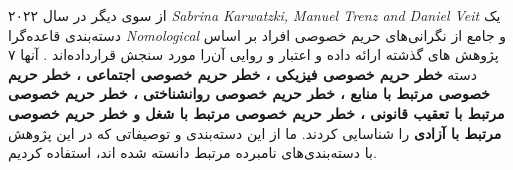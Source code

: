 

	از سوی دیگر
\fi %
\ifMultidimensionalNatureOfPrivacyRisksConceptualisationMeasurementAndImplicationsForDigitalServices
	در سال ۲۰۲۲
	\textit{
		\gls{Sabrina Karwatzki, Manuel Trenz and Daniel Veit}
	}
	 یک دسته‌بندی قاعده‌گرا
	\textit{
		\gls{Nomological}
	}
	و جامع از نگرانی‌های حریم خصوصی افراد بر اساس پژوهش های گذشته ارائه داده و اعتبار و روایی آن‌را مورد سنجش قرار‌داده‌اند
	\citep{karwatzkiMultidimensionalNaturePrivacy}
	\!.
	آنها ۷ دسته
	\textbf{
		خطر حریم خصوصی فیزیکی
		،
		خطر حریم خصوصی اجتماعی
		،
		خطر حریم خصوصی مرتبط با منابع
		،
		خطر حریم خصوصی روانشناختی
		،
		خطر حریم خصوصی مرتبط با تعقیب قانونی
		،
		خطر حریم خصوصی مرتبط با شغل
		\textmd{و}
		خطر حریم خصوصی مرتبط با آزادی
	}
\fi %
را شناسایی کردند. ما
از این دسته‌بندی و توصیفاتی که در این پژوهش با دسته‌بندی‌های نامبرده مرتبط دانسته شده اند، استفاده کردیم.
